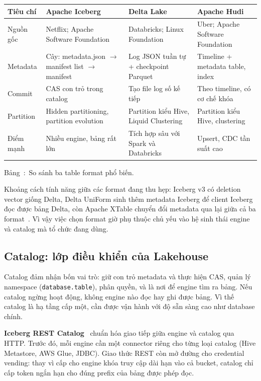\documentclass[12pt]{article}
\newenvironment{figblock}{\par\medskip\noindent\begin{minipage}{\linewidth}}{\end{minipage}\par\medskip}
\newcounter{bang}
\newcommand{\tabcap}[2]{%
  \begin{captionbelowboxaivn}\refstepcounter{bang}Bảng~\thebang:~#1\label{#2}\end{captionbelowboxaivn}}
\begin{document}
\begin{figblock}\begin{center}
\renewcommand{\arraystretch}{1.3}
\begin{tabularx}{\linewidth}{|P{2.3cm}|L|L|L|}
\hline
{}
\textbf{Tiêu chí} & \textbf{Apache Iceberg} & \textbf{Delta Lake} & \textbf{Apache Hudi} \\
\hline
Nguồn gốc & Netflix; Apache Software Foundation & Databricks; Linux Foundation & Uber; Apache Software Foundation \\
\hline
Metadata & Cây: metadata.json $\rightarrow$ manifest list $\rightarrow$ manifest & Log JSON tuần tự + checkpoint Parquet & Timeline + metadata table, index \\
\hline
Commit & CAS con trỏ trong catalog & Tạo file log số kế tiếp & Theo timeline, có cơ chế khóa \\
\hline
Partition & Hidden partitioning, partition evolution & Partition kiểu Hive, Liquid Clustering & Partition kiểu Hive, clustering \\
\hline
Điểm mạnh & Nhiều engine, bảng rất lớn & Tích hợp sâu với Spark và Databricks & Upsert, CDC tần suất cao \\
\hline
\end{tabularx}
\end{center}
\tabcap{So sánh ba table format phổ biến.}{tab:formats3}
\end{figblock}

Khoảng cách tính năng giữa các format đang thu hẹp: Iceberg v3 có deletion vector giống Delta, Delta UniForm sinh thêm metadata Iceberg để client Iceberg đọc được bảng Delta, còn Apache XTable chuyển đổi metadata qua lại giữa cả ba format~\cite{xtable2026}. Vì vậy việc chọn format giờ phụ thuộc chủ yếu vào hệ sinh thái engine và catalog mà tổ chức đang dùng.

\subsection{Catalog: lớp điều khiển của Lakehouse}

Catalog đảm nhận bốn vai trò: giữ con trỏ metadata và thực hiện CAS, quản lý namespace (\texttt{database.table}), phân quyền, và là nơi để engine tìm ra bảng. Nếu catalog ngừng hoạt động, không engine nào đọc hay ghi được bảng. Vì thế catalog là hạ tầng cấp một, cần được vận hành với độ sẵn sàng cao như database chính.

\textbf{Iceberg REST Catalog}~\cite{iceberg2026rest} chuẩn hóa giao tiếp giữa engine và catalog qua HTTP. Trước đó, mỗi engine cần một connector riêng cho từng loại catalog (Hive Metastore, AWS Glue, JDBC). Giao thức REST còn mở đường cho credential vending: thay vì cấp cho engine khóa truy cập dài hạn vào cả bucket, catalog chỉ cấp token ngắn hạn cho đúng prefix của bảng được phép đọc.
\end{document}
